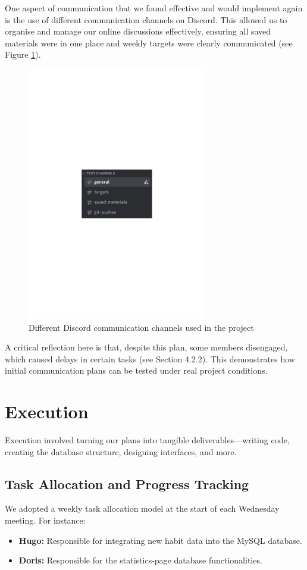 One aspect of communication that we found effective and would implement again is the use of different communication channels on Discord. This allowed us to organise and manage our online discussions effectively, ensuring all saved materials were in one place and weekly targets were clearly communicated (see Figure \ref{fig:discord_channels}).

\begin{figure}[H]
    \centering
    \includegraphics[width=0.7\textwidth]{resources/discord_channels.pdf}
    \caption{Different Discord communication channels used in the project}
    \label{fig:discord_channels}
\end{figure}

A critical reflection here is that, despite this plan, some members disengaged, which caused delays in certain tasks (see Section 4.2.2). This demonstrates how initial communication plans can be tested under real project conditions.

\section{Execution}
Execution involved turning our plans into tangible deliverables—writing code, creating the database structure, designing interfaces, and more.

\subsection{Task Allocation and Progress Tracking}
We adopted a weekly task allocation model at the start of each Wednesday meeting. For instance:
\begin{itemize}
    \item \textbf{Hugo:} Responsible for integrating new habit data into the MySQL database.
    \item \textbf{Doris:} Responsible for the statistics-page database functionalities.
\end{itemize}

